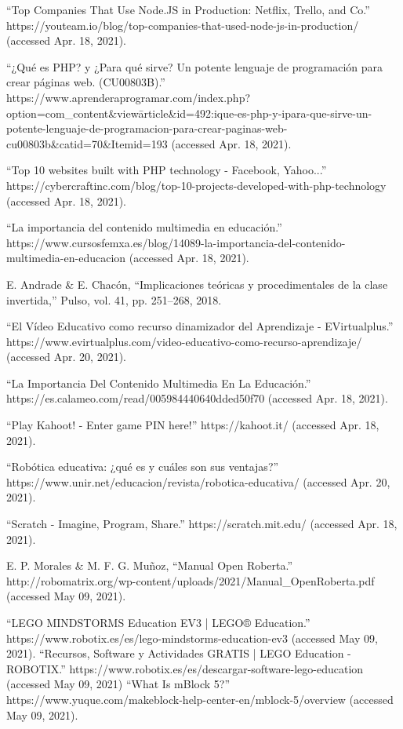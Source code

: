 \begin{thebibliography}{69}
 ``Top Companies That Use Node.JS in Production: Netflix, Trello, and Co.” https://youteam.io/blog/top-companies-that-used-node-js-in-production/ (accessed Apr. 18, 2021).


	``¿Qué es PHP? y ¿Para qué sirve? Un potente lenguaje de programación para crear páginas web. (CU00803B).” https://www.aprenderaprogramar.com/index.php?option=com\_content\&view\=article\&id=492:ique-es-php-y-ipara-que-sirve-un-potente-lenguaje-de-programacion-para-crear-paginas-web-cu00803b\&catid=70\&Itemid=193 (accessed Apr. 18, 2021).
  
	``Top 10 websites built with PHP technology - Facebook, Yahoo...” https://cybercraftinc.com/blog/top-10-projects-developed-with-php-technology (accessed Apr. 18, 2021).


 ``La importancia del contenido multimedia en educación.” https://www.cursosfemxa.es/blog/14089-la-importancia-del-contenido-multimedia-en-educacion (accessed Apr. 18, 2021).


 E. Andrade \& E. Chacón, ``Implicaciones teóricas y procedimentales de la clase invertida,” Pulso, vol. 41, pp. 251–268, 2018.

 ``El Vídeo Educativo como recurso dinamizador del Aprendizaje - EVirtualplus.” https://www.evirtualplus.com/video-educativo-como-recurso-aprendizaje/ (accessed Apr. 20, 2021).

	``La Importancia Del Contenido Multimedia En La Educación.” https://es.calameo.com/read/005984440640dded50f70 (accessed Apr. 18, 2021).

	``Play Kahoot! - Enter game PIN here!” https://kahoot.it/ (accessed Apr. 18, 2021).

 ``Robótica educativa: ¿qué es y cuáles son sus ventajas?” https://www.unir.net/educacion/revista/robotica-educativa/ (accessed Apr. 20, 2021).

 ``Scratch - Imagine, Program, Share.” https://scratch.mit.edu/ (accessed Apr. 18, 2021).

 	E. P. Morales \& M. F. G. Muñoz, ``Manual Open Roberta.” http://robomatrix.org/wp-content/uploads/2021/Manual\_OpenRoberta.pdf (accessed May 09, 2021).

 ``LEGO MINDSTORMS Education EV3 | LEGO® Education.” https://www.robotix.es/es/lego-mindstorms-education-ev3 (accessed May 09, 2021).
 ``Recursos, Software y Actividades GRATIS | LEGO Education - ROBOTIX.” https://www.robotix.es/es/descargar-software-lego-education (accessed May 09, 2021)
 ``What Is mBlock 5?” https://www.yuque.com/makeblock-help-center-en/mblock-5/overview (accessed May 09, 2021).



\end{thebibliography}
